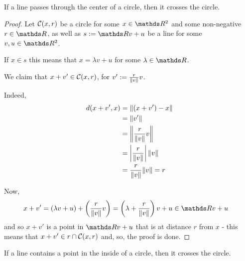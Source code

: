 \begin{lemma}
	If a line passes through the center of a circle, then it crosses the circle.
\end{lemma}
\begin{proof}
	Let $\mathcal C(x,r)$ be a circle for some $x\in \R^2$ and some non-negative $r\in \R$, as well as $s:=\R v+u$ be a line for some $v,u\in \R^2$.
	
	If $x\in s$ this means that $x=\lambda v+u$ for some $\lambda \in \R$.
	
	We claim that $x+v'\in \mathcal C(x,r)$, for $v':=\frac{r}{\lVert v\rVert}v$.
	
	Indeed, 
	\begin{align*}
		d(x+v',x)&=\lVert(x+v')-x\rVert\\
		&=\lVert v'\rVert\\
		&=\left\Vert\frac{r}{\lVert v\rVert}v\right\Vert\\
		&=\left\vert\frac{r}{\lVert v\rVert}\right\vert\lVert v\rVert\\
		&=\frac{r}{\lVert v\rVert}\lVert v\rVert=r
	\end{align*}
	
	Now,
	\begin{align*}
		x+v'&=(\lambda v+u)+\left(\frac{r}{\norm v}v\right)=\left(\lambda + \frac{r}{\norm v}\right)v+u\in \R v+u
	\end{align*}and so $x+v'$ is a point in $\R v+u$ that is at distance $r$ from $x$ - this means that $x+v'\in r\cap \mathcal C(x,r)$ and, so, the proof is done.
\end{proof}
\begin{lemma}
	If a line contains a point in the inside of a circle, then it crosses the circle.
\end{lemma}
